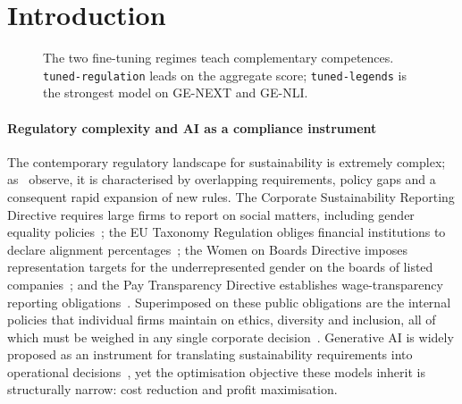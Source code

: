 \documentclass[pdflatex, sn-apa]{sn-jnl}%
\theoremstyle{thmstyleone}%
\theoremstyle{thmstyletwo}%
\theoremstyle{thmstylethree}%
\newcommand{\modellegends}{\texttt{tuned-legends}}
\newcommand{\modelreg}{\texttt{tuned-regulation}}
\begin{document}
\section{Introduction}
\label{sec:intro}
 
\begin{figure}[t]
\centering
{}
\caption{The two fine-tuning regimes teach complementary competences.
\modelreg{} leads on the aggregate score; \modellegends{} is the strongest
model on GE-NEXT and GE-NLI.}
\label{fig:teaser}
\end{figure}
 

\paragraph{Regulatory complexity and AI as a compliance instrument}
The contemporary regulatory landscape for sustainability is extremely complex;
as~\citet{sargsyan2025legends} observe, it is characterised by overlapping
requirements, policy gaps and a consequent rapid expansion of new rules. The
Corporate Sustainability Reporting Directive requires large firms to report on
social matters, including gender equality
policies~\citep{europeancommission2022csrd}; the EU Taxonomy Regulation obliges
financial institutions to declare alignment
percentages~\citep{europeancommission2025taxonomy}; the Women on Boards
Directive imposes representation targets for the underrepresented gender on the
boards of listed companies~\citep{europeanparliament2022wob}; and the Pay
Transparency Directive establishes wage-transparency reporting
obligations~\citep{europeancommission2025equalpay}. Superimposed on these public
obligations are the internal policies that individual firms maintain on ethics,
diversity and inclusion, all of which must be weighed in any single corporate
decision~\citep{sargsyan2025legends}. Generative AI is widely proposed as an
instrument for translating sustainability requirements into operational
decisions~\citep{storey2025genai}, yet the optimisation objective these models
inherit is structurally narrow: cost reduction and profit maximisation.
 
\end{document}
